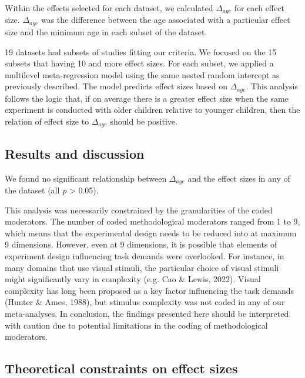 \documentclass[
  man]{apa6}
\begin{document}
Within the effects selected for each dataset, we calculated \(\Delta_{age}\) for each effect size. \(\Delta_{age}\) was the difference between the age associated with a particular effect size and the minimum age in each subset of the dataset.

19 datasets had subsets of studies fitting our criteria. We focused on the 15 subsets that having 10 and more effect sizes. For each subset, we applied a multilevel meta-regression model using the same nested random intercept as previously described. The model predicts effect sizes based on \(\Delta_{age}\). This analysis follows the logic that, if on average there is a greater effect size when the same experiment is conducted with older children relative to younger children, then the relation of effect size to \(\Delta_{age}\) should be positive.

\hypertarget{results-and-discussion-1}{%
\subsection{Results and discussion}\label{results-and-discussion-1}}

We found no significant relationship between \(\Delta_{age}\) and the effect sizes in any of the dataset (all \emph{p} \textgreater{} 0.05).

This analysis was necessarily constrained by the granularities of the coded moderators. The number of coded methodological moderators ranged from 1 to 9, which means that the experimental design needs to be reduced into at maximum 9 dimensions. However, even at 9 dimensions, it is possible that elements of experiment design influencing task demands were overlooked. For instance, in many domains that use visual stimuli, the particular choice of visual stimuli might significantly vary in complexity (e.g. Cao \& Lewis, 2022). Visual complexity has long been proposed as a key factor influencing the task demands (Hunter \& Ames, 1988), but stimulus complexity was not coded in any of our meta-analyses. In conclusion, the findings presented here should be interpreted with caution due to potential limitations in the coding of methodological moderators.

\hypertarget{theoretical-constraints-on-effect-sizes}{%
\subsection{Theoretical constraints on effect sizes}\label{theoretical-constraints-on-effect-sizes}}
\end{document}
